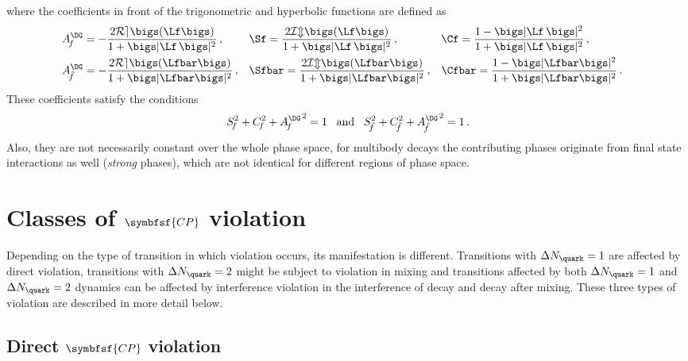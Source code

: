 where the coefficients in front of the trigonometric and hyperbolic functions are defined as
\begin{align}
&A_{\kern -1.5pt f}^{\DG}=-\frac{2\mathcal{R{}e}{}\bigs(\Lf\bigs)}{1+\bigs|\Lf\,\bigs|^2}\,,&
&\Sf=\frac{2\mathcal{I{}m}{}\bigs(\Lf\bigs)}{1+\bigs|\Lf\,\bigs|^2}\,,&
&\Cf=\frac{1-\bigs|\Lf\,\bigs|^2}{1+\bigs|\Lf\,\bigs|^2}\,,&\label{eq:cpcoeff}\\
&A_{\kern 1.0pt\overline{\kern -2.5pt f\kern 1.0pt}}^{\DG}=-\frac{2\mathcal{R{}e}{}\bigs(\Lfbar\bigs)}{1+\bigs|\Lfbar\bigs|^2}\,,&
&\Sfbar=\frac{2\mathcal{I{}m}{}\bigs(\Lfbar\bigs)}{1+\bigs|\Lfbar\bigs|^2}\,,&
&\Cfbar=\frac{1-\bigs|\Lfbar\bigs|^2}{1+\bigs|\Lfbar\bigs|^2}\,.&\label{eq:cpcoeffbar}
\end{align}
These coefficients satisfy the conditions
\begin{equation}
S_{\kern -1.5pt f}^2+C_{\kern -1.5pt f}^2+{A_{\kern -1.5pt f}^{\DG}}^{\kern 0.7pt 2}=1\,\,\,\,\,\text{and}\,\,\,\,\,S_{\kern 1.0pt\overline{\kern -2.5pt f\kern 1pt}}^2+C_{\kern 1.0pt\overline{\kern -2.5pt f\kern 1pt}}^2+{A_{\kern 1.0pt\overline{\kern -2.5pt f\kern 1.0pt}}^{\DG}}^{\kern 0.7pt 2}=1\,.\label{eq:CpCoeffCond}
\end{equation}
Also, they are not necessarily constant over the whole phase space, \ie for multibody decays the contributing phases originate from final state interactions as well (\ie \emph{strong} phases), which are not identical for different regions of phase space.

\newpage

\section[head={Classes of \CP violation},tocentry={Classes of \CP violation}]{Classes of $\symbfsf{C{}P}$ violation}
\label{sec:CPVClasses}

Depending on the type of transition in which \CP violation occurs, its manifestation is different.
Transitions with $\Delta N_\quark=1$ are affected by direct \CP violation, transitions with $\Delta N_\quark=2$ might be subject to \CP violation in mixing and
transitions affected by both $\Delta N_\quark=1$ and $\Delta N_\quark=2$ dynamics can be affected by interference \CP violation in the interference of decay and decay after mixing.
These three types of \CP violation are described in more detail below.

\subsection[head={Direct \CP violation},tocentry={Direct \CP violation}]{Direct $\symbfsf{C{}P}$ violation}
\label{sec:DirectCPV}


